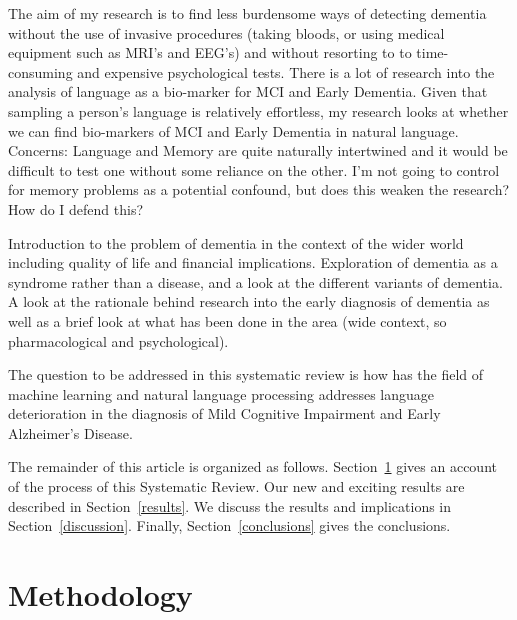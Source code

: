 \documentclass[12pt]{article}
\begin{document}
The aim of my research is to find less burdensome ways of detecting dementia without the use of invasive procedures (taking bloods, or using medical equipment such as MRI's and EEG's) and without resorting to to time-consuming and expensive psychological tests. There is a lot of research into the analysis of language as a bio-marker for MCI and Early Dementia. Given that sampling a person's language is relatively effortless, my research looks at whether we can find bio-markers of MCI and Early Dementia in natural language.\newline
Concerns: Language and Memory are quite naturally intertwined and it would be difficult to test one without some reliance on the other. I'm not going to control for memory problems as a potential confound, but does this weaken the research? How do I defend this? \newline
\par 
Introduction to the problem of dementia in the context of the wider world including quality of life and financial implications. Exploration of dementia as a syndrome rather than a disease, and a look at the different variants of dementia. A look at the rationale behind research into the early diagnosis of dementia as well as a brief look at what has been done in the area (wide context, so pharmacological and psychological). \newline

The question to be addressed in this systematic review is how has the field of machine learning and natural language processing addresses language deterioration in the diagnosis of Mild Cognitive Impairment and Early Alzheimer's Disease.

The remainder of this article is organized as follows. Section~\ref{methodology} gives an account of the process of this Systematic Review. Our new and exciting results are described in Section~\ref{results}. We discuss the results and implications in Section~\ref{discussion}. Finally, Section~\ref{conclusions} gives the conclusions.

\section{Methodology}\label{methodology}
\end{document}
